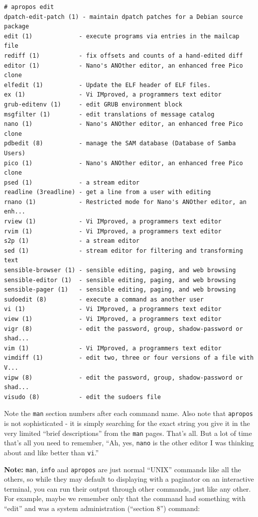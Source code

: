 \documentclass[10pt,]{book}
\numberwithin{figure}{chapter}
\begin{document}
\begin{verbatim}
# apropos edit
dpatch-edit-patch (1) - maintain dpatch patches for a Debian source package
edit (1)             - execute programs via entries in the mailcap file
rediff (1)           - fix offsets and counts of a hand-edited diff
editor (1)           - Nano's ANOther editor, an enhanced free Pico clone
elfedit (1)          - Update the ELF header of ELF files.
ex (1)               - Vi IMproved, a programmers text editor
grub-editenv (1)     - edit GRUB environment block
msgfilter (1)        - edit translations of message catalog
nano (1)             - Nano's ANOther editor, an enhanced free Pico clone
pdbedit (8)          - manage the SAM database (Database of Samba Users)
pico (1)             - Nano's ANOther editor, an enhanced free Pico clone
psed (1)             - a stream editor
readline (3readline) - get a line from a user with editing
rnano (1)            - Restricted mode for Nano's ANOther editor, an enh...
rview (1)            - Vi IMproved, a programmers text editor
rvim (1)             - Vi IMproved, a programmers text editor
s2p (1)              - a stream editor
sed (1)              - stream editor for filtering and transforming text
sensible-browser (1) - sensible editing, paging, and web browsing
sensible-editor (1)  - sensible editing, paging, and web browsing
sensible-pager (1)   - sensible editing, paging, and web browsing
sudoedit (8)         - execute a command as another user
vi (1)               - Vi IMproved, a programmers text editor
view (1)             - Vi IMproved, a programmers text editor
vigr (8)             - edit the password, group, shadow-password or shad...
vim (1)              - Vi IMproved, a programmers text editor
vimdiff (1)          - edit two, three or four versions of a file with V...
vipw (8)             - edit the password, group, shadow-password or shad...
visudo (8)           - edit the sudoers file
\end{verbatim}

Note the \texttt{man} section numbers after each command name. Also note
that \texttt{apropos} is not sophisticated - it is simply searching for
the exact string you give it in the very limited ``brief descriptions''
from the \texttt{man} pages. That's all. But a lot of time that's all
you need to remember, ``Ah, yes, \texttt{nano} is the other editor I was
thinking about and like better than \texttt{vi}.''

\textbf{Note:} \texttt{man}, \texttt{info} and \texttt{apropos} are just
normal ``UNIX'' commands like all the others, so while they may default
to displaying with a paginator on an interactive terminal, you can run
their output through other commands, just like any other. For example,
maybe we remember only that the command had something with ``edit'' and
was a system administration (``section 8'') command:
\end{document}
